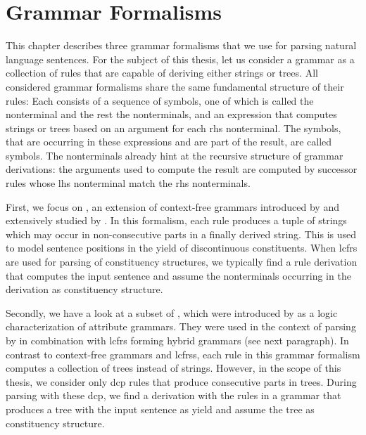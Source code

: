 \documentclass[../document.tex]{subfiles}
\begin{document}
    \chapter{Grammar Formalisms}
    This chapter describes three grammar formalisms that we use for parsing natural language sentences.
    For the subject of this thesis, let us consider a grammar as a collection of rules that are capable of deriving either strings or trees.
    All considered grammar formalisms share the same fundamental structure of their rules:
        Each consists of a sequence of  symbols, one of which is called the  nonterminal and the rest the  nonterminals, and an expression that computes strings or trees based on an argument for each \gls{rhs} nonterminal.
        The symbols, that are occurring in these expressions and are part of the result, are called  symbols.
    The \glspl{nonterminal} already hint at the recursive structure of grammar derivations: the arguments used to compute the result are computed by successor rules whose \gls{lhs} nonterminal match the \gls{rhs} nonterminals.


    First, we focus on , an extension of context-free grammars introduced by \citet{VijWeiJos87} and extensively studied by \citet{SekMatFujKas91}.
    In this formalism, each rule produces a tuple of strings which may occur in non-consecutive parts in a finally derived string.
    This is used to model sentence positions in the yield of discontinuous constituents.
    When \gls{lcfrs} are used for parsing of constituency structures, we typically find a rule derivation that computes the input sentence and assume the nonterminals occurring in the derivation as constituency structure.

    Secondly, we have a look at a subset of , which were introduced by \cite{???} as a logic characterization of attribute grammars.
    They were used in the context of parsing by \cite{Geb,Geb} in combination with \gls{lcfrs} forming hybrid grammars (see next paragraph).
    In contrast to context-free grammars and \glspl{lcfrs}, each rule in this grammar formalism computes a collection of trees instead of strings.
    However, in the scope of this thesis, we consider only \gls{dcp} rules that produce consecutive parts in trees.
    During parsing with these \gls{dcp}, we find a derivation with the rules in a grammar that produces a tree with the input sentence as yield and assume the tree as constituency structure.
\end{document}
